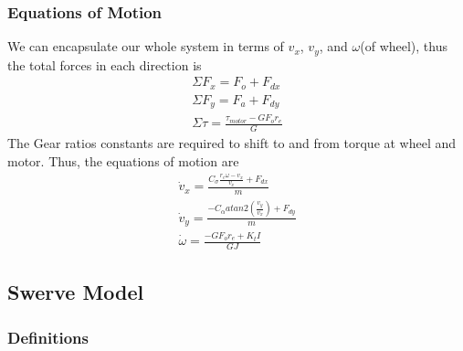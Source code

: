 \documentclass{article}
\begin{document}
\subsubsection{Equations of Motion}
We can encapsulate our whole system in terms of $v_x$, $v_y$, and $\omega$(of wheel), thus the total forces in each direction is
\begin{gather}
    \Sigma F_x = F_o + F_{dx}\\
    \Sigma F_y = F_a + F_{dy}\\
    \Sigma \tau = \frac{\tau_{motor} - GF_o r_e}{G}
\end{gather}
The Gear ratios constants are required to shift to and from torque at wheel and motor.
Thus, the equations of motion are
\begin{gather}
    \dot{v}_x = \frac{C_\sigma \frac{r_e \omega - v_x}{v_x} + F_{dx}}{m}\\
    \dot{v}_y = \frac{-C_\alpha atan2\left(\frac{v_y}{v_x}\right) + F_{dy}}{m}\\
    \dot{\omega} = \frac{-GF_or_e + K_tI}{GJ} \label{wheel_omega}
\end{gather}

\subsection{Swerve Model}
\subsubsection{Definitions}
\end{document}
